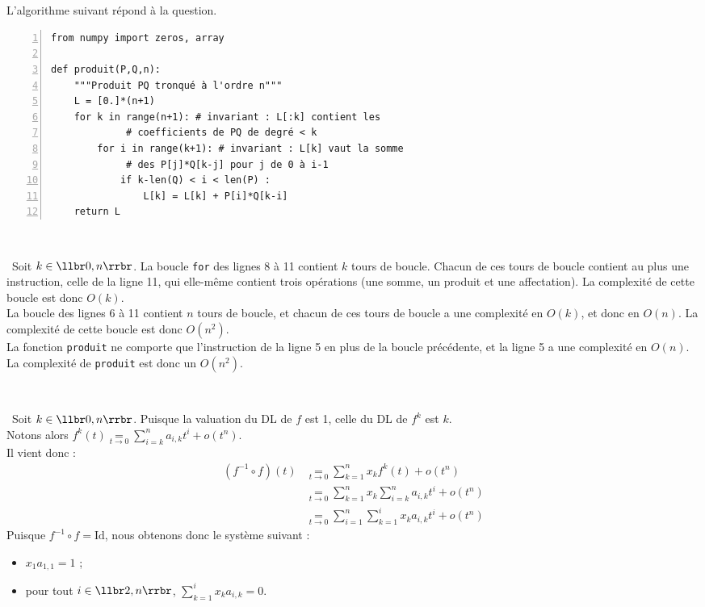 \exer{[SYS-001]}
\setcounter{numques}{0}~\\

\setcounter{question}{0}

\question\

L'algorithme suivant répond à la question. 
\begin{Verbatim}[gobble=0,numbers=left]
from numpy import zeros, array

def produit(P,Q,n):
    """Produit PQ tronqué à l'ordre n"""
    L = [0.]*(n+1)
    for k in range(n+1): # invariant : L[:k] contient les
			 # coefficients de PQ de degré < k
        for i in range(k+1): # invariant : L[k] vaut la somme 
			 # des P[j]*Q[k-j] pour j de 0 à i-1
            if k-len(Q) < i < len(P) :
                L[k] = L[k] + P[i]*Q[k-i]
    return L
\end{Verbatim}

\medskip\

\question\ Soit $k\in\llbr 0,n\rrbr$. La boucle \texttt{for} des lignes 8 à 11 contient $k$ tours de boucle. Chacun de 
ces tours de boucle contient au plus une instruction, celle de la ligne 11, qui elle-même contient trois opérations 
(une somme, un produit et une affectation). La complexité de cette boucle est donc $O(k)$.\\
La boucle des lignes 6 à 11 contient $n$ tours de boucle, et chacun de ces tours de boucle a une complexité en 
$O(k)$, et donc en $O(n)$. La complexité de cette boucle est donc $O(n^2)$.\\
La fonction \texttt{produit} ne comporte que l'instruction de la ligne 5 en plus de la boucle précédente, et la ligne 5 
a une complexité en $O(n)$.\\
La complexité de \texttt{produit} est donc un $O(n^2)$.


\medskip\

\question\ Soit $k\in\llbr 0,n\rrbr$. Puisque la valuation du DL de $f$ est 1, celle du DL de $f^k$ est $k$.\\
Notons alors $f^k(t)\underset{t\to0}{=}\displaystyle\sum_{i=k}^n a_{i,k}t^i + o(t^n)$.\\
Il vient donc :
\begin{align*}
 (f^{-1}\circ f)(t)&\underset{t\to0}{=}  \displaystyle\sum_{k=1}^n x_kf^k(t) + o(t^n)\\
 &\underset{t\to0}{=} \displaystyle\sum_{k=1}^n x_k\displaystyle\sum_{i=k}^na_{i,k}t^i + o(t^n)\\
 &\underset{t\to0}{=} \displaystyle\sum_{i=1}^n \displaystyle\sum_{k=1}^i x_k a_{i,k}t^i + o(t^n)
\end{align*}
Puisque $f^{-1}\circ f=\mathrm{Id}$, nous obtenons donc le système suivant :\\
\begin{itemize}
 \item $x_1 a_{1,1} = 1$ ;
 \item pour tout $i\in\llbr 2,n\rrbr$, $\displaystyle\sum_{k=1}^i x_k a_{i,k} = 0$.
\end{itemize}

